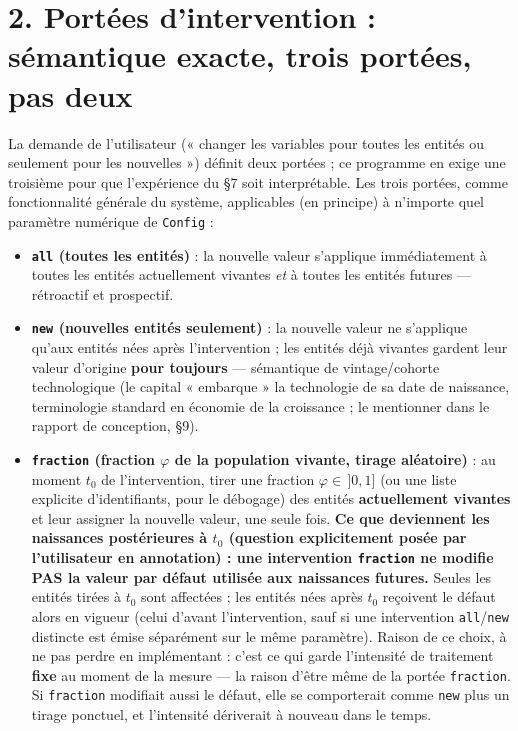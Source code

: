 \documentclass[11pt,a4paper]{article}
\newcommand{\code}[1]{\texttt{#1}}
\begin{document}
\section*{2. Portées d'intervention : sémantique exacte, trois portées, pas deux}

La demande de l'utilisateur (« changer les variables pour toutes les
entités ou seulement pour les nouvelles ») définit deux portées ; ce
programme en exige une troisième pour que l'expérience du \S7 soit
interprétable. Les trois portées, comme fonctionnalité générale du
système, applicables (en principe) à n'importe quel paramètre numérique
de \code{Config} :

\begin{itemize}
\item \textbf{\code{all} (toutes les entités)} : la nouvelle valeur
  s'applique immédiatement à toutes les entités actuellement vivantes
  \emph{et} à toutes les entités futures --- rétroactif et prospectif.
\item \textbf{\code{new} (nouvelles entités seulement)} : la nouvelle
  valeur ne s'applique qu'aux entités nées après l'intervention ; les
  entités déjà vivantes gardent leur valeur d'origine \textbf{pour
  toujours} --- sémantique de vintage/cohorte technologique (le capital
  « embarque » la technologie de sa date de naissance, terminologie
  standard en économie de la croissance ; le mentionner dans le rapport
  de conception, \S9).
\item \textbf{\code{fraction} (fraction $\varphi$ de la population
  vivante, tirage aléatoire)} : au moment $t_0$ de l'intervention, tirer
  une fraction $\varphi \in\, ]0,1]$ (ou une liste explicite
  d'identifiants, pour le débogage) des entités \textbf{actuellement
  vivantes} et leur assigner la nouvelle valeur, une seule fois.
  \textbf{Ce que deviennent les naissances postérieures à $t_0$ (question
  explicitement posée par l'utilisateur en annotation) : une
  intervention \code{fraction} ne modifie PAS la valeur par défaut
  utilisée aux naissances futures.} Seules les entités tirées à $t_0$
  sont affectées ; les entités nées après $t_0$ reçoivent le défaut
  alors en vigueur (celui d'avant l'intervention, sauf si une
  intervention \code{all}/\code{new} distincte est émise séparément sur
  le même paramètre). Raison de ce choix, à ne pas perdre en
  implémentant : c'est ce qui garde l'intensité de traitement
  \textbf{fixe} au moment de la mesure --- la raison d'être même de la
  portée \code{fraction}. Si \code{fraction} modifiait aussi le défaut,
  elle se comporterait comme \code{new} plus un tirage ponctuel, et
  l'intensité dériverait à nouveau dans le temps.


\end{itemize}
\end{document}
